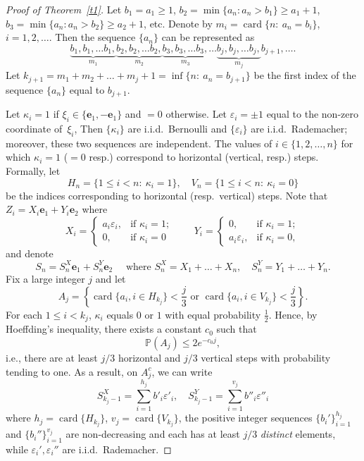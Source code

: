 \documentclass[12pt]{article}
\newcommand\eps{\varepsilon}
\renewcommand\P{\mathbb{P}}
\newcommand\be{\mathbf{e}}
\DeclareMathOperator{\card}{card}
\begin{document}
\begin{proof}[Proof of Theorem~\ref{t1}]
Let $b_1=a_1\ge 1$, $b_2=\min\{a_n: a_n>b_1\}\ge a_1+1$,  $b_3=\min\{a_n: a_n>b_2\}\ge a_2+1$, etc. Denote by $m_i=\card\{n:\ a_n=b_i\}$, $i=1,2,\dots$. Then the sequence $\{a_n\}$ can be represented as
$$
\underbrace{b_1, b_1, \dots b_1,}_{m_1}
\underbrace{b_2, b_2, \dots b_2,}_{m_2} 
\underbrace{b_3, b_3, \dots b_3,}_{m_3} 
\dots
\underbrace{b_j, b_j, \dots b_j,}_{m_j}b_{j+1},\dots .
$$
Let  $k_{j+1}=m_1+m_2+\dots+m_{j}+1=\inf\{n:\ a_n=b_{j+1}\}$ be the first index of the sequence $\{a_n\}$ equal to $b_{j+1}$.

Let $\kappa_i=1$ if $\xi_i\in\{\be_1,-\be_1\}$ and $=0$ otherwise. Let $\eps_i=\pm 1$ equal to the non-zero coordinate of~$\xi_i$, Then $\{\kappa_i\}$ are i.i.d.\ Bernoulli and $\{\eps_i\}$ are i.i.d.\ Rademacher; moreover, these two sequences are independent. The values of $i\in\{1,2,\dots,n\}$ for which $\kappa_i=1$ ($=0$ resp.) correspond to horizontal (vertical, resp.) steps. Formally, let
$$
H_n=\{1\le i<n:\ \kappa_i=1\},\quad
V_n=\{1\le i< n:\ \kappa_i=0\}
$$
be the indices corresponding to horizontal (resp.\ vertical) steps. Note that $Z_i=X_i \be_1+Y_i\be_2$ where 
$$
X_i=\begin{cases}
   a_i\eps_i,&\text{if } \kappa_i=1;\\
   0, &\text{if } \kappa_i=0
\end{cases}
\qquad
Y_i=\begin{cases}
   0,&\text{if } \kappa_i=1;\\
   a_i\eps_i,&\text{if } \kappa_i=0,
\end{cases}
$$
and denote 
$$
S_n=S^X_n\be_1+S^Y_n\be_2\quad \text{ where }
S_n^X=X_1+\dots+X_n,\quad S_n^Y=Y_1+\dots+Y_n.
$$
Fix a large integer $j$ and let
$$
A_j=\left\{\card\{a_i,i\in H_{k_j}\}<\frac j3\text{ \ or \ }\card\{a_i,i\in V_{k_j}\}<\frac j3\right\}.
$$
For each $1\le i< k_j$, $\kappa_i$ equals $0$ or $1$ with equal probability $\frac12$. Hence, by Hoeffding's inequality, there exists a constant $c_0$ such that  
$$
\P(A_j)\le 2e^{-c_0 j},
$$ 
i.e., there are at least $j/3$ horizontal and $j/3$ vertical steps with probability tending to one. As a result, on $A_j^c$, we can write
$$
S^X_{k_j-1}=\sum_{i=1}^{h_j} b'_i \eps'_i, \quad S^Y_{k_j-1}=\sum_{i=1}^{v_j} b''_i \eps''_i
$$
where $h_j=\card\{H_{k_j}\}$, $v_j=\card\{V_{k_j}\}$, the positive integer sequences $\{b_i'\}_{i=1}^{h_j}$ and $\{b_i''\}_{i=1}^{v_j}$ are non-decreasing and each has at least $j/3$ {\em distinct} elements, while $\eps_i',\eps_i''$ are i.i.d.\ Rademacher.


\end{proof}
\end{document}
